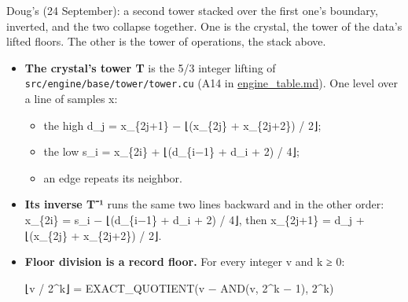 Doug's (24 September): a second tower stacked over the first one's boundary, inverted, and the two collapse together. One is the crystal, the tower of the data's lifted floors. The other is the tower of operations, the stack above.

\begin{itemize}
\item \textbf{The crystal's tower T} is the 5/3 integer lifting of \texttt{src/\allowbreak{}engine/\allowbreak{}base/\allowbreak{}tower/\allowbreak{}tower.\allowbreak{}cu} (A14 in \hyperref[chap:engine-table]{engine\_\allowbreak{}table.md}). One level over a line of samples x:

\begin{itemize}
\item the high d\_\allowbreak{}j = x\_\allowbreak{}\{2j+1\} − ⌊(x\_\allowbreak{}\{2j\} + x\_\allowbreak{}\{2j+2\}) / 2⌋;
\item the low s\_\allowbreak{}i = x\_\allowbreak{}\{2i\} + ⌊(d\_\allowbreak{}\{i−1\} + d\_\allowbreak{}i + 2) / 4⌋;
\item an edge repeats its neighbor.
\end{itemize}
\item \textbf{Its inverse T⁻¹} runs the same two lines backward and in the other order: x\_\allowbreak{}\{2i\} = s\_\allowbreak{}i − ⌊(d\_\allowbreak{}\{i−1\} + d\_\allowbreak{}i + 2) / 4⌋, then x\_\allowbreak{}\{2j+1\} = d\_\allowbreak{}j + ⌊(x\_\allowbreak{}\{2j\} + x\_\allowbreak{}\{2j+2\}) / 2⌋.
\item \textbf{Floor division is a record floor.} For every integer v and k ≥ 0:

⌊v / 2\textasciicircum{}k⌋ = EXACT\_\allowbreak{}QUOTIENT(v − AND(v, 2\textasciicircum{}k − 1), 2\textasciicircum{}k)


\end{itemize}
